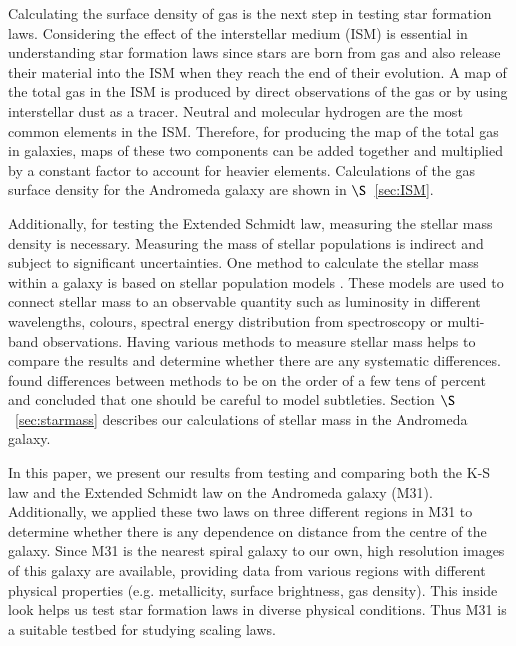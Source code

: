Calculating the surface density of gas is the next step in testing star formation laws.
Considering the effect of the interstellar medium (ISM) is essential in understanding star formation laws since stars are born from gas and also release their material into the ISM when they reach the end of their evolution. 
A map of the total gas in the ISM is produced by direct observations of the gas or by using interstellar dust as a tracer. Neutral and molecular hydrogen are the most common elements in the ISM. Therefore, for producing the map of the total gas in galaxies, maps of these two components can be added together and multiplied by a constant factor to account for heavier elements. 
Calculations of the gas surface density for the Andromeda galaxy are shown in $\S$~\ref{sec:ISM}. 

Additionally, for testing the Extended Schmidt law, measuring the stellar mass density is necessary. Measuring the mass of stellar populations is indirect and subject to significant uncertainties. One method to calculate the stellar mass within a galaxy is based on stellar population models \citep[e.g.][]{ Bruzual93, Kotulla09}. These models are used to connect stellar mass to an observable quantity such as luminosity in different wavelengths, colours, spectral energy distribution from spectroscopy or multi-band observations.
Having various methods to measure stellar mass helps to compare the results and determine whether there are any systematic differences. 
\citep{McLaughlin05} found differences between methods to be on the order of a few tens of percent and concluded that one should be careful to model subtleties.
Section $\S$~\ref{sec:starmass} describes our calculations of stellar mass in the Andromeda galaxy.

In this paper, we present our results from testing and comparing both the K-S law and the Extended Schmidt law on the Andromeda galaxy (M31). Additionally, we applied these two laws on three different regions in M31 to determine whether there is any dependence on distance from the centre of the galaxy. Since M31 is the nearest spiral galaxy to our own, high resolution images of this galaxy are available, providing data from various regions with different physical properties (e.g. metallicity, surface brightness, gas density). This inside look helps us test star formation laws in diverse physical conditions. Thus M31 is a suitable testbed for studying scaling laws.


